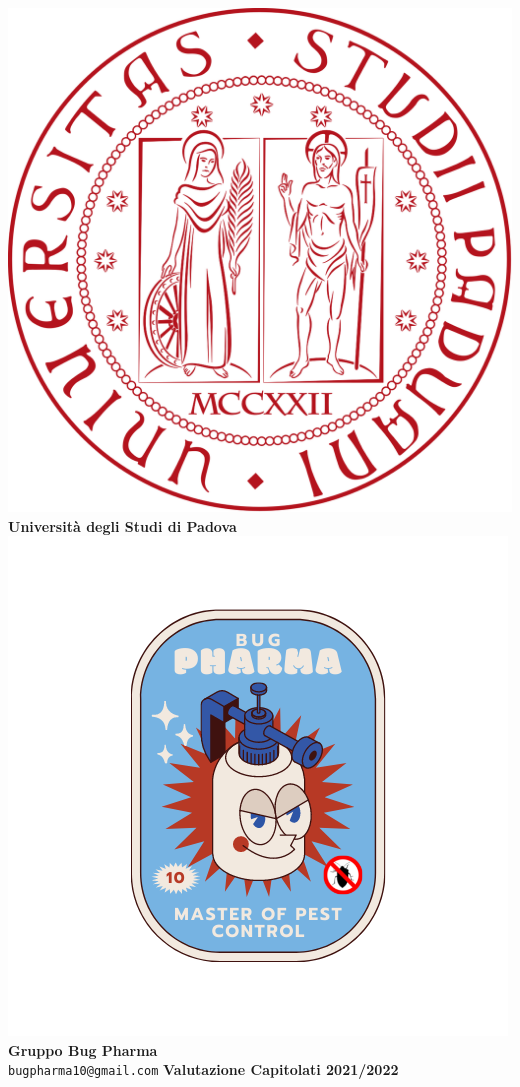 \documentclass[11pt]{article}
\begin{document}
\thispagestyle{empty}
	\begin{titlepage}
		\begin{center}
			\includegraphics[scale = 0.05]{Res/logo_unipd.png}\\
			\bigskip
			\large \textbf{Università degli Studi di Padova} \\
			\vfill
			\includegraphics[scale = 0.7]{Res/BugPharma_Logo.png}\\
			\huge \textbf{Gruppo Bug Pharma} \\
			\vfill
			\large \texttt{bugpharma10@gmail.com}
			\vfill
			\Huge \textbf{Valutazione Capitolati 2021/2022}\\
			

\end{center}
\end{titlepage}
\end{document}

